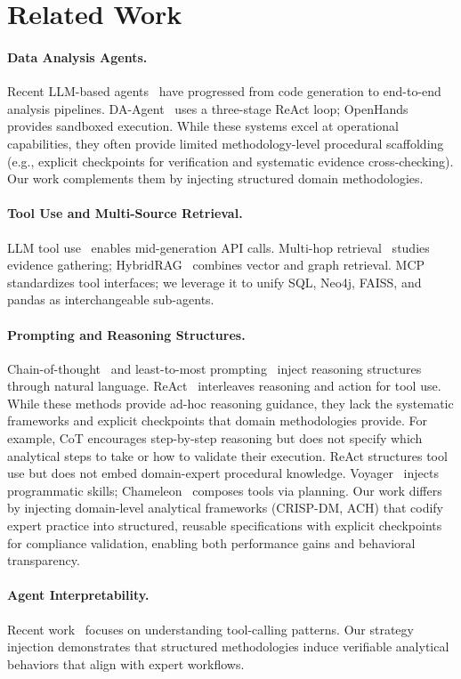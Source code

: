 \section{Related Work}

\paragraph{Data Analysis Agents.}
Recent LLM-based agents~\cite{ds1000,spider2v2024,dacomp2025,openhands2024} have progressed from code generation to end-to-end analysis pipelines. DA-Agent~\cite{dacomp2025} uses a three-stage ReAct loop; OpenHands~\cite{openhands2024} provides sandboxed execution. While these systems excel at operational capabilities, they often provide limited methodology-level procedural scaffolding (e.g., explicit checkpoints for verification and systematic evidence cross-checking). Our work complements them by injecting structured domain methodologies.

\paragraph{Tool Use and Multi-Source Retrieval.}
LLM tool use~\cite{toolformer2023,react2023} enables mid-generation API calls. Multi-hop retrieval~\cite{multihoprag2024,ircot2023} studies evidence gathering; HybridRAG~\cite{hybridrag2024} combines vector and graph retrieval. MCP~\cite{mcp2024} standardizes tool interfaces; we leverage it to unify SQL, Neo4j, FAISS, and pandas as interchangeable sub-agents.

\paragraph{Prompting and Reasoning Structures.}
Chain-of-thought~\cite{wei2022cot} and least-to-most prompting~\cite{l2m2022} inject reasoning structures through natural language. ReAct~\cite{react2023} interleaves reasoning and action for tool use. While these methods provide ad-hoc reasoning guidance, they lack the systematic frameworks and explicit checkpoints that domain methodologies provide. For example, CoT encourages step-by-step reasoning but does not specify which analytical steps to take or how to validate their execution. ReAct structures tool use but does not embed domain-expert procedural knowledge. Voyager~\cite{voyager2023} injects programmatic skills; Chameleon~\cite{chameleon2023} composes tools via planning. Our work differs by injecting domain-level analytical frameworks (CRISP-DM, ACH) that codify expert practice into structured, reusable specifications with explicit checkpoints for compliance validation, enabling both performance gains and behavioral transparency.

\paragraph{Agent Interpretability.}
Recent work~\cite{toolbench2023} focuses on understanding tool-calling patterns. Our strategy injection demonstrates that structured methodologies induce verifiable analytical behaviors that align with expert workflows.
